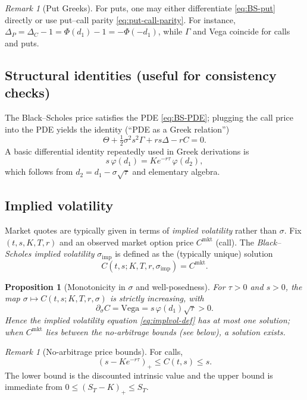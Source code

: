 \documentclass[11pt]{article}
\newcommand{\1}{\mathbf{1}}
\theoremstyle{plain}
\newtheorem{proposition}[theorem]{Proposition}
\theoremstyle{definition}
\theoremstyle{remark}
\newtheorem{remark}[theorem]{Remark}
\begin{document}
\begin{remark}[Put Greeks]
For puts, one may either differentiate \eqref{eq:BS-put} directly or use put--call parity
\eqref{eq:put-call-parity}. For instance,
$\Delta_P=\Delta_C-1=\Phi(d_1)-1=-\Phi(-d_1)$, while $\Gamma$ and Vega coincide for calls and puts.
\end{remark}

\subsection{Structural identities (useful for consistency checks)}
The Black--Scholes price satisfies the PDE \eqref{eq:BS-PDE}; plugging the call price into the PDE yields
the identity (``PDE as a Greek relation'')
\begin{equation}\label{eq:BS-PDE-greeks}
\Theta + \tfrac12\sigma^2 s^2 \Gamma + r s \Delta - r C = 0.
\end{equation}
A basic differential identity repeatedly used in Greek derivations is
\begin{equation}\label{eq:phi-identity}
s\,\varphi(d_1)=K e^{-r\tau}\,\varphi(d_2),
\end{equation}
which follows from $d_2=d_1-\sigma\sqrt{\tau}$ and elementary algebra.

\subsection{Implied volatility}
Market quotes are typically given in terms of \emph{implied volatility} rather than $\sigma$.
Fix $(t,s,K,T,r)$ and an observed market option price $C^{\mathrm{mkt}}$ (call).
The \emph{Black--Scholes implied volatility} $\sigma_{\mathrm{imp}}$ is defined as the (typically unique) solution
\begin{equation}\label{eq:implvol-def}
C(t,s;K,T,r,\sigma_{\mathrm{imp}})=C^{\mathrm{mkt}}.
\end{equation}

\begin{proposition}[Monotonicity in $\sigma$ and well-posedness]
For $\tau>0$ and $s>0$, the map $\sigma\mapsto C(t,s;K,T,r,\sigma)$ is strictly increasing, with
\[
\partial_\sigma C=\text{Vega}= s\,\varphi(d_1)\sqrt{\tau}>0.
\]
Hence the implied volatility equation \eqref{eq:implvol-def} has at most one solution; when
$C^{\mathrm{mkt}}$ lies between the no-arbitrage bounds (see below), a solution exists.
\end{proposition}

\begin{remark}[No-arbitrage price bounds]
For calls,
\[
(s-K e^{-r\tau})_+ \le C(t,s) \le s.
\]
The lower bound is the discounted intrinsic value and the upper bound is immediate from
$0\le (S_T-K)_+\le S_T$.
\end{remark}
\end{document}
